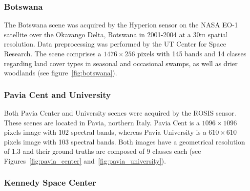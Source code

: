 \documentclass[remotesensing,article,submit,moreauthors,pdftex]{Definitions/mdpi}
\begin{document}
\begin{table}
	\centering
    \captionsetup{justification=centering}
    \caption{Description of the datasets used for this
    experiment.\label{tab:datasets_description}\vspace{-.6cm}}
\end{table}
\begin{paracol}{2}
\linenumbers
\switchcolumn

\subsubsection*{Botswana}

The Botswana scene was acquired by the Hyperion sensor on the NASA EO-1
satellite over the Okavango Delta, Botswana in 2001-2004 at a 30m spatial
resolution. Data preprocessing was performed by the UT Center for Space
Research. The scene comprises a $1476 \times 256$ pixels with 145 bands and 14
classes regarding land cover types in seasonal and occasional swamps, as well
as drier woodlands (see figure~\ref{fig:botswana}).

\subsubsection*{Pavia Cent and University}

Both Pavia Center and University scenes were acquired by the ROSIS sensor.
These scenes are located in Pavia, northern Italy. Pavia Cent is a $1096
\times 1096$ pixels image with 102 spectral bands, whereas Pavia University is
a $610 \times 610$ pixels image with 103 spectral bands. Both images have a
geometrical resolution of 1.3 and their ground truths are
composed of 9 classes each (see Figures~\ref{fig:pavia_center}
and~\ref{fig:pavia_university}).

\subsubsection*{Kennedy Space Center}


\end{paracol}
\end{document}
